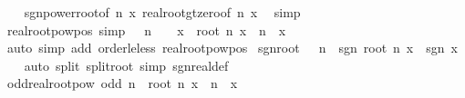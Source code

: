 \begin{isabellebody}
%
\isadelimproof
\ \ %
\endisadelimproof
%
\isatagproof
{}\isamarkupfalse%
\ sgn{\isacharunderscore}{\kern0pt}power{\isacharunderscore}{\kern0pt}root{\isacharbrackleft}{\kern0pt}of\ n\ x{\isacharbrackright}{\kern0pt}\ real{\isacharunderscore}{\kern0pt}root{\isacharunderscore}{\kern0pt}gt{\isacharunderscore}{\kern0pt}zero{\isacharbrackleft}{\kern0pt}of\ n\ x{\isacharbrackright}{\kern0pt}\ \isamarkupfalse%
\ simp%
\endisatagproof
{\isafoldproof}%
%
\isadelimproof
%
\endisadelimproof
\isanewline
\isanewline
{}\isamarkupfalse%
\ real{\isacharunderscore}{\kern0pt}root{\isacharunderscore}{\kern0pt}pow{\isacharunderscore}{\kern0pt}pos{}\ {\isacharbrackleft}{\kern0pt}simp{\isacharbrackright}{\kern0pt}{\isacharcolon}{\kern0pt}\ {\isachardoublequoteopen}{}\ {\isacharless}{\kern0pt}\ n\ {\isasymLongrightarrow}\ {}\ {\isasymle}\ x\ {\isasymLongrightarrow}\ root\ n\ x\ {\isacharcircum}{\kern0pt}\ n\ {\isacharequal}{\kern0pt}\ x{\isachardoublequoteclose}\ \ \isanewline
%
\isadelimproof
\ \ %
\endisadelimproof
%
\isatagproof
{}\isamarkupfalse%
\ {\isacharparenleft}{\kern0pt}auto\ simp\ add{\isacharcolon}{\kern0pt}\ order{\isacharunderscore}{\kern0pt}le{\isacharunderscore}{\kern0pt}less\ real{\isacharunderscore}{\kern0pt}root{\isacharunderscore}{\kern0pt}pow{\isacharunderscore}{\kern0pt}pos{\isacharparenright}{\kern0pt}%
\endisatagproof
{\isafoldproof}%
%
\isadelimproof
%
\endisadelimproof
\isanewline
\isanewline
{}\isamarkupfalse%
\ sgn{\isacharunderscore}{\kern0pt}root{\isacharcolon}{\kern0pt}\ {\isachardoublequoteopen}{}\ {\isacharless}{\kern0pt}\ n\ {\isasymLongrightarrow}\ sgn\ {\isacharparenleft}{\kern0pt}root\ n\ x{\isacharparenright}{\kern0pt}\ {\isacharequal}{\kern0pt}\ sgn\ x{\isachardoublequoteclose}\isanewline
%
\isadelimproof
\ \ %
\endisadelimproof
%
\isatagproof
{}\isamarkupfalse%
\ {\isacharparenleft}{\kern0pt}auto\ split{\isacharcolon}{\kern0pt}\ split{\isacharunderscore}{\kern0pt}root\ simp{\isacharcolon}{\kern0pt}\ sgn{\isacharunderscore}{\kern0pt}real{\isacharunderscore}{\kern0pt}def{\isacharparenright}{\kern0pt}%
\endisatagproof
{\isafoldproof}%
%
\isadelimproof
\isanewline
%
\endisadelimproof
\isanewline
{}\isamarkupfalse%
\ odd{\isacharunderscore}{\kern0pt}real{\isacharunderscore}{\kern0pt}root{\isacharunderscore}{\kern0pt}pow{\isacharcolon}{\kern0pt}\ {\isachardoublequoteopen}odd\ n\ {\isasymLongrightarrow}\ root\ n\ x\ {\isacharcircum}{\kern0pt}\ n\ {\isacharequal}{\kern0pt}\ x{\isachardoublequoteclose}\isanewline

\end{isabellebody}
